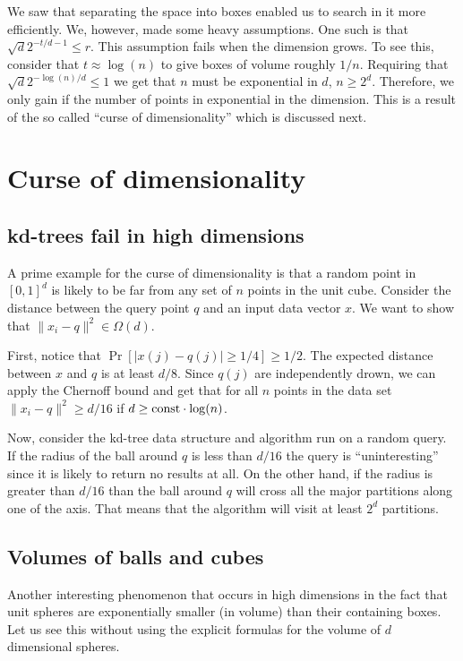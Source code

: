 \documentclass{article}
\begin{document}
We saw that separating the space into boxes enabled us to search in it more efficiently.
We, however, made some heavy assumptions. One such is that $\sqrt{d}2^{-t/d-1} \le r$.
This assumption fails when the dimension grows. To see this, consider that $t \approx \log(n)$ 
to give boxes of volume roughly $1/n$. Requiring that $\sqrt{d}2^{-\log(n)/d} \le 1$ we get that $n$ must be
exponential in $d$, $n \ge 2^{d}$. Therefore, we only gain if the number of points in exponential in the dimension.
This is a result of the so called ``curse of dimensionality'' which is discussed next.

\section{Curse of dimensionality}
\subsection{kd-trees fail in high dimensions}
A prime example for the curse of dimensionality is that a random point in $[0,1]^d$ is likely to be far from any set of $n$ points in the unit cube.
Consider the distance between the query point $q$ and an input data vector $x$.
We want to show that $\|x_i-q\|^2 \in \Omega(d)$.

First, notice that $\Pr[|x(j)- q(j)| \ge 1/4] \ge 1/2$. The expected distance between $x$ and $q$ is at least $d/8$.
Since $q(j)$ are independently drown, we can apply the Chernoff bound and get that for all $n$ points in the data set
$\|x_i-q\|^2 \ge d/16$ if $d \ge {\operatorname{const}}\cdot\log(n)$.

Now, consider the kd-tree data structure and algorithm run on a random query.
If the radius of the ball around $q$ is less than $d/16$ the query is ``uninteresting'' since it is likely to return no results at all.
On the other hand, if the radius is greater than $d/16$ than the ball around $q$ will cross all the major partitions 
along one of the axis. That means that the algorithm will visit at least $2^d$ partitions.


\subsection{Volumes of balls and cubes}
Another interesting phenomenon that occurs in high dimensions in the fact that unit spheres 
are exponentially smaller (in volume) than their containing boxes.
Let us see this without using the explicit formulas for the volume of $d$ dimensional spheres.
\end{document}
